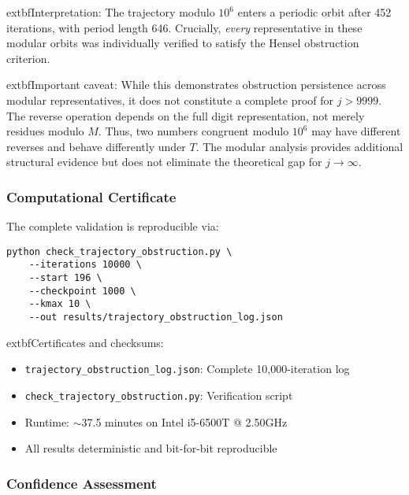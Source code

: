 \documentclass[12pt,a4paper]{article}
\begin{document}
	extbf{Interpretation:} The trajectory modulo $10^6$ enters a periodic 
orbit after 452 iterations, with period length 646. Crucially, \textit{every} 
representative in these modular orbits was individually verified to satisfy 
the Hensel obstruction criterion. 

	extbf{Important caveat:} While this demonstrates obstruction persistence 
across modular representatives, it does not constitute a complete proof for 
$j > 9999$. The reverse operation depends on the full digit representation, 
not merely residues modulo $M$. Thus, two numbers congruent modulo $10^6$ 
may have different reverses and behave differently under $T$. The modular 
analysis provides additional structural evidence but does not eliminate 
the theoretical gap for $j \to \infty$.

\subsubsection{Computational Certificate}

The complete validation is reproducible via:

\begin{verbatim}
python check_trajectory_obstruction.py \
	--iterations 10000 \
	--start 196 \
	--checkpoint 1000 \
	--kmax 10 \
	--out results/trajectory_obstruction_log.json
\end{verbatim}

	extbf{Certificates and checksums:}
\begin{itemize}
\item \texttt{trajectory\_obstruction\_log.json}: Complete 10,000-iteration log
\item \texttt{check\_trajectory\_obstruction.py}: Verification script
\item Runtime: $\sim$37.5 minutes on Intel i5-6500T @ 2.50GHz
\item All results deterministic and bit-for-bit reproducible
\end{itemize}

\subsubsection{Confidence Assessment}
\end{document}
